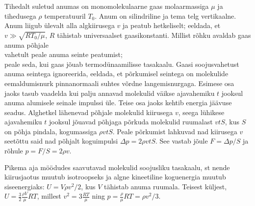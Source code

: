 
Tihedalt suletud anumas on monomolekulaarne gaas molaarmassiga $\mu$ ja tihedusega $\rho$ temperatuuril $T_0$. Anum on silindriline ja tema telg vertikaalne. Anum liigub ülevalt alla algkiirusega $v$ ja peatub hetkeliselt; eeldada, et $v\gg \sqrt{RT_0/\mu}$, $R$ tähistab universaalset gaasikonstanti. Millist rõhku avaldab gaas anuma põhjale\\
\osa vahetult peale anuma seinte peatumist;\\
\osa peale seda, kui gaas jõuab termodünaamilisse tasakaalu. Gaasi soojusvahetust anuma seintega ignoreerida, eeldada, et põrkumisel seintega on molekulide eemaldumisnurk pinnanormaali suhtes võrdne langemisnurgaga.\hint
Esimese osa jaoks tasub vaadelda kui palju annavad molekulid väikse ajavahemiku $t$ jooksul anuma alumisele seinale impulssi üle. Teise osa jaoks kehtib energia jäävuse seadus.\solu
Alghetkel lähenevad põhjale molekulid kiirusega $v$, seega lühikese ajavahemiku $t$ jooksul jõuavad põhjaga põrkuda molekulid ruumalast $vtS$, kus $S$ on põhja pindala, kogumassiga $\rho vtS$. Peale põrkumist lahkuvad nad kiirusega $v$ seetõttu said nad põhjalt koguimpulsi $\Delta p=2\rho vtS$. See vastab jõule $F=\Delta p/S$ ja rõhule $p=F/S=2\rho v$.

Pikema aja möödudes saavutavad molekulid soojusliku tasakaalu, st nende kiirusjaotus muutub isotroopseks ja algne kineetiline koguenergia muutub siseenergiaks: $U=V\rho v^2/2$, kus $V$ tähistab anuma ruumala. Teisest küljest, $U=\frac 32 \frac{\rho V}\mu RT$, millest $v^2=3 \frac{ RT}\mu$ ning $p=\frac{\rho}\mu RT=\rho v^2/3$.
\probend